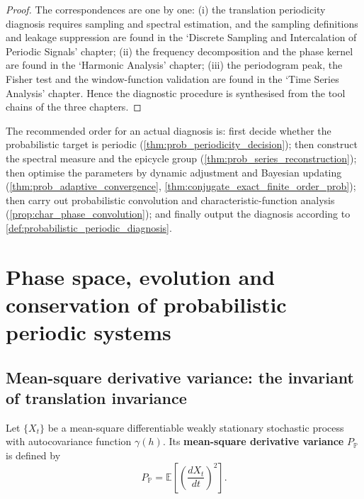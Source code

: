 \begin{proof}
The correspondences are one by one:
(i) the translation periodicity diagnosis requires sampling and spectral estimation, and the sampling definitions and leakage suppression are found in the `Discrete Sampling and Intercalation of Periodic Signals' chapter;
(ii) the frequency decomposition and the phase kernel are found in the `Harmonic Analysis' chapter;
(iii) the periodogram peak, the Fisher test and the window-function validation are found in the `Time Series Analysis' chapter.
Hence the diagnostic procedure is synthesised from the tool chains of the three chapters.
\end{proof}

\begin{remark}\label{rem:prob_integration_order}
The recommended order for an actual diagnosis is: first decide whether the probabilistic target is periodic (\cref{thm:prob_periodicity_decision}); then construct the spectral measure and the epicycle group (\cref{thm:prob_series_reconstruction}); then optimise the parameters by dynamic adjustment and Bayesian updating (\cref{thm:prob_adaptive_convergence}, \cref{thm:conjugate_exact_finite_order_prob}); then carry out probabilistic convolution and characteristic-function analysis (\cref{prop:char_phase_convolution}); and finally output the diagnosis according to \cref{def:probabilistic_periodic_diagnosis}.
\end{remark}

\section{Phase space, evolution and conservation of probabilistic periodic systems}
\label{sec:prob_phase_space}

\subsection{Mean-square derivative variance: the invariant of translation invariance}

\begin{definition}\label{def:probability_momentum}
Let $\{X_t\}$ be a mean-square differentiable weakly stationary stochastic process with autocovariance function $\gamma(h)$. Its \textbf{mean-square derivative variance} $P_{\mathbb P}$ is defined by
\[
P_{\mathbb P}=\mathbb E\left[\left(\frac{dX_t}{dt}\right)^2\right].
\]
\end{definition}

